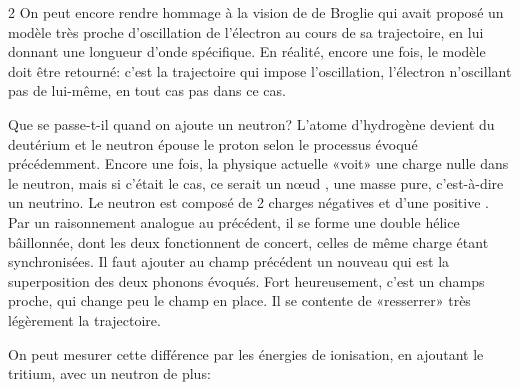 \begin{multicols}{2}
On peut encore rendre hommage à la vision de de Broglie qui avait
proposé un modèle très proche d'oscillation de l'électron au cours de
sa trajectoire, en lui donnant une longueur d'onde spécifique.\cite{debroglie1956tentative} En
réalité, encore une fois, le modèle doit être retourné: c'est la
trajectoire qui impose l'oscillation, l'électron n'oscillant pas de
lui-même, en tout cas pas dans ce cas.

Que se passe-t-il quand on ajoute un neutron? L'atome d'hydrogène
devient du deutérium et le neutron épouse le proton selon le processus
évoqué précédemment. Encore une fois, la physique actuelle «voit»
une charge nulle dans le neutron, mais si c'était le cas, ce serait un
nœud , une masse pure, c'est-à-dire un neutrino. Le neutron est
composé de 2 charges négatives  et d'une positive . Par un
raisonnement analogue au précédent, il se forme une double hélice
bâillonnée, dont les deux fonctionnent de concert, celles de même charge
étant synchronisées. Il faut ajouter au champ précédent un nouveau qui
est la superposition des deux phonons évoqués. Fort heureusement, c'est
un champs proche, qui change peu le champ en place. Il se contente de
«resserrer» très légèrement la trajectoire.

On peut mesurer cette différence par les énergies de ionisation, en
ajoutant le tritium, avec un neutron de plus:
\end{multicols}

\vspace*{-1cm}
\begin{center}
\end{center}



